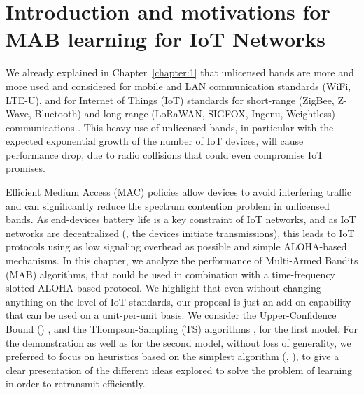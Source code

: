 \section{Introduction and motivations for MAB learning for IoT Networks}
\label{sec:4:motivations}

We already explained in Chapter~\ref{chapter:1} that
unlicensed bands are more and more used and considered for mobile and LAN communication standards (WiFi, LTE-U), and for Internet of Things (IoT) standards for short-range (ZigBee, Z-Wave, Bluetooth) and long-range (LoRaWAN, SIGFOX, Ingenu, Weightless) communications \cite{Centenaro16}.
This heavy use of unlicensed bands, in particular with the expected exponential growth of the number of IoT devices, will cause performance drop, due to radio collisions that could even compromise IoT promises.

Efficient Medium Access (MAC) policies allow devices to avoid interfering traffic and can significantly reduce the spectrum contention problem in unlicensed bands.
As end-devices battery life is a key constraint of IoT networks,
and as IoT networks are decentralized (\ie, the devices initiate transmissions),
this leads to IoT protocols using as low signaling overhead as possible and simple ALOHA-based mechanisms.
%
In this chapter, we analyze the performance of Multi-Armed Bandits (MAB) algorithms, that could be used in combination with a time-frequency slotted ALOHA-based protocol.
We highlight that even without changing anything on the level of IoT standards, our proposal is just an add-on capability that can be used on a unit-per-unit basis.
We consider the Upper-Confidence Bound (\UCB) \cite{Auer02}, and the Thompson-Sampling (TS) algorithms \cite{Thompson33,AgrawalGoyal11,
Kaufmann12Thompson}, for the first model. For the demonstration as well as for the second model, without loss of generality, we preferred to focus on heuristics based on the simplest algorithm (\ie, \UCB), to give a clear presentation of the different ideas explored to solve the problem of learning in order to retransmit efficiently.

